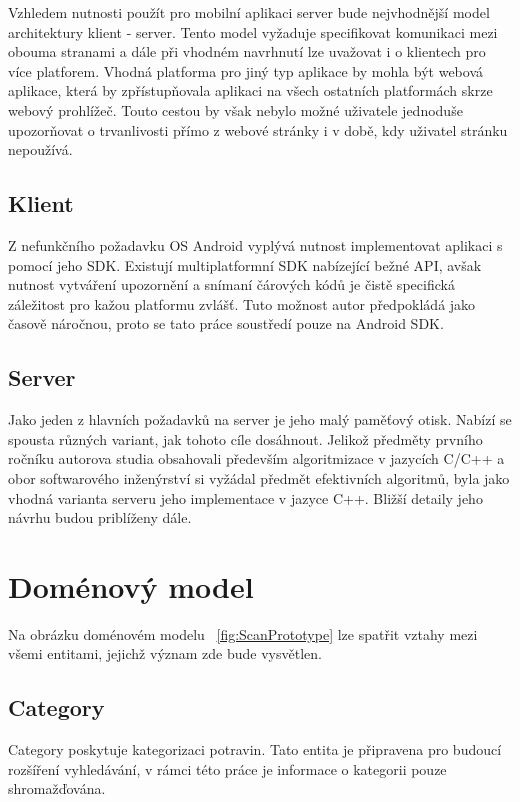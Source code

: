 \documentclass[thesis=B,czech]{FITthesis}[2013/10/20]
\begin{document}
Vzhledem nutnosti použít pro mobilní aplikaci server bude nejvhodnější model architektury klient - server. Tento model vyžaduje specifikovat komunikaci mezi obouma stranami a dále při vhodném navrhnutí lze uvažovat i o klientech pro více platforem. Vhodná platforma pro jiný typ aplikace by mohla být webová aplikace, která by zpřístupňovala aplikaci na všech ostatních platformách skrze webový prohlížeč. Touto cestou by však nebylo možné uživatele jednoduše upozorňovat o trvanlivosti přímo z webové stránky i v době, kdy uživatel stránku nepoužívá.

\subsection{Klient}

Z nefunkčního požadavku OS Android vyplývá nutnost implementovat aplikaci s pomocí jeho SDK. Existují multiplatformní SDK nabízející bežné API, avšak nutnost vytváření upozornění a snímaní čárových kódů je čistě specifická záležitost pro kažou platformu zvlášť. Tuto možnost autor předpokládá jako časově náročnou, proto se tato práce soustředí pouze na Android SDK.

\subsection{Server}

Jako jeden z hlavních požadavků na server je jeho malý paměťový otisk. Nabízí se spousta různých variant, jak tohoto cíle dosáhnout. Jelikož předměty prvního ročníku autorova studia obsahovali především algoritmizace v jazycích C/C++ a obor softwarového inženýrství si vyžádal předmět efektivních algoritmů, byla jako vhodná varianta serveru jeho implementace v jazyce C++. Bližší detaily jeho návrhu budou priblíženy dále.

\section{Doménový model}

Na obrázku doménovém modelu ~\ref{fig:ScanPrototype} lze spatřit vztahy mezi všemi entitami, jejichž význam zde bude vysvětlen.

\subsection{Category}
Category poskytuje kategorizaci potravin. Tato entita je připravena pro budoucí rozšíření vyhledávání, v rámci této práce je informace o kategorii pouze shromažďována. 
\end{document}
